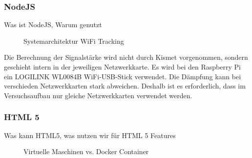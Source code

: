 \documentclass[a4paper]{spie}  %
\begin{document}
\subsubsection{NodeJS}
Was ist NodeJS, Warum genutzt
\begin{figure}[h!]
	\centering
		\caption{Systemarchitektur WiFi Tracking}
		\label{fig:sysArch}
\end{figure}

Die Berechnung der Signalstärke wird nicht durch Kismet vorgenommen, sondern geschieht intern in der jeweiligen Netzwerkkarte. Es wird bei den Raspberry Pi ein LOGILINK WL0084B WiFi-USB-Stick verwendet. Die Dämpfung kann bei verschieden Netzwerkkarten stark abweichen. Deshalb ist es erforderlich, dass im Versuchsaufbau nur gleiche Netzwerkkarten verwendet werden.

\subsubsection{HTML 5}
Was kann HTML5, was nutzen wir für HTML 5 Features
\begin{figure}[h!]
	\centering
		\caption{Virtuelle Maschinen vs. Docker Container\cite{dockercontainer}}
		\label{fig:dockerVM}
\end{figure}
\end{document}
